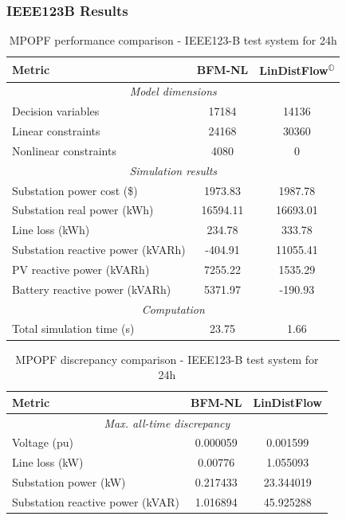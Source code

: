 \subsubsection{IEEE123B Results}

\begin{table}[H]
    \centering
    \caption{MPOPF performance comparison - IEEE123-B test system for 24h}
    \label{table:mpopf-tradeoffs-opt-ieee123b}
    \begin{tabular}{|l|c|c|}
    \hline
    \textbf{Metric} & \textbf{BFM-NL} & \textbf{LinDistFlow\textsuperscript{\(\mathbb{O}\)}} \\ \hline
    \multicolumn{3}{|c|}{\textit{Model dimensions}} \\ \hline
    Decision variables & {17184} & {14136} \\ \hline
    Linear constraints & {24168} & {30360} \\ \hline
    Nonlinear constraints & {4080} & {0} \\ \hline
    \multicolumn{3}{|c|}{\textit{Simulation results}} \\ \hline
    Substation power cost (\$) & 1973.83 & 1987.78 \\ \hline
    Substation real power (kWh) & 16594.11 & 16693.01 \\ \hline
    Line loss (kWh) & 234.78 & 333.78 \\ \hline
    Substation reactive power (kVARh) & -404.91 & 11055.41 \\ \hline
    PV reactive power (kVARh) & 7255.22 & 1535.29 \\ \hline
    Battery reactive power (kVARh) & 5371.97 & -190.93 \\ \hline
    \multicolumn{3}{|c|}{\textit{Computation}} \\ \hline
    Total simulation time (s) & 23.75 & 1.66 \\ \hline
    \end{tabular}
\end{table}

\begin{table}[H]
    \centering
    \caption{MPOPF discrepancy comparison - IEEE123-B test system for 24h}
    \label{table:mpopf-tradeoffs-feas-ieee123b}
    \begin{tabular}{|l|c|c|}
    \hline
    \textbf{Metric} & \textbf{BFM-NL} & \textbf{LinDistFlow} \\ \hline
    \multicolumn{3}{|c|}{\textit{Max. all-time discrepancy}} \\ \hline
    Voltage (pu) & 0.000059 & 0.001599 \\ \hline
    Line loss (kW) & 0.00776 & 1.055093 \\ \hline
    Substation power (kW) & 0.217433 & 23.344019 \\ \hline
    Substation reactive power (kVAR) & 1.016894 & 45.925288 \\ \hline
    \end{tabular}
\end{table}

